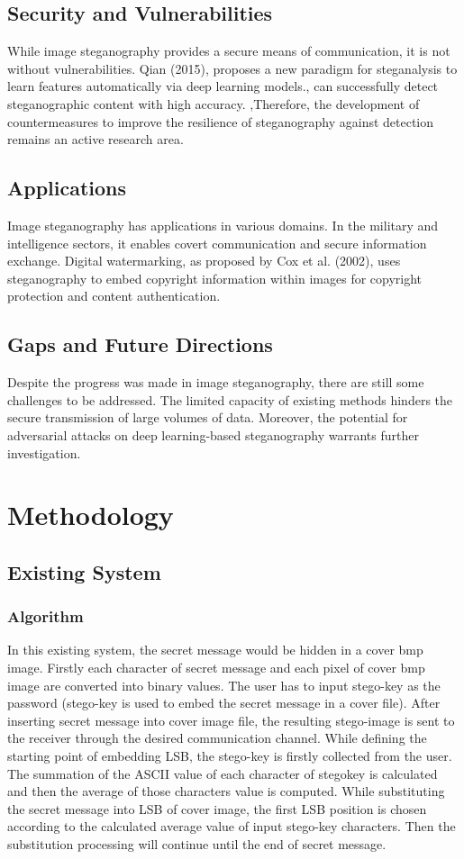 \documentclass{report}
\begin{document}
\section{Security and Vulnerabilities}
While image steganography provides a secure means of communication, it is not without vulnerabilities. Qian (2015), proposes a new paradigm for steganalysis to learn features automatically via deep learning models., can successfully detect steganographic content with high accuracy.\cite{qian2015deep} ,Therefore, the development of countermeasures to improve the resilience of steganography against detection remains an active research area.

\section{Applications}
Image steganography has applications in various domains. In the military and intelligence sectors, it enables covert communication and secure information exchange. Digital watermarking, as proposed by Cox et al. (2002), uses steganography to embed copyright information within images for copyright protection and content authentication.\cite{cox2007digital}
\section{Gaps and Future Directions}
Despite the progress was made in image steganography, there are still some challenges to be addressed. The limited capacity of existing methods hinders the secure transmission of large volumes of data. Moreover, the potential for adversarial attacks on deep learning-based steganography warrants further investigation.

\newpage
\chapter{Methodology}
\section{Existing System}
\subsection{Algorithm}
In this existing system, the secret message would be hidden in a cover bmp image. Firstly each character of secret message and each pixel of cover bmp image are converted into binary values. The user has to input stego-key as the password (stego-key is used to embed the secret message in a cover file). After inserting secret message into cover image file, the resulting stego-image is sent to the receiver through the desired communication channel. While defining the starting point of embedding LSB, the stego-key is firstly collected from the user. The summation of the ASCII value of each character of stegokey is calculated and then the average of those characters value is computed. While substituting the secret message into LSB of cover image, the first LSB position is chosen according to the calculated average value of input stego-key characters. Then the substitution processing will continue until the end of secret message. \\ 
\end{document}
